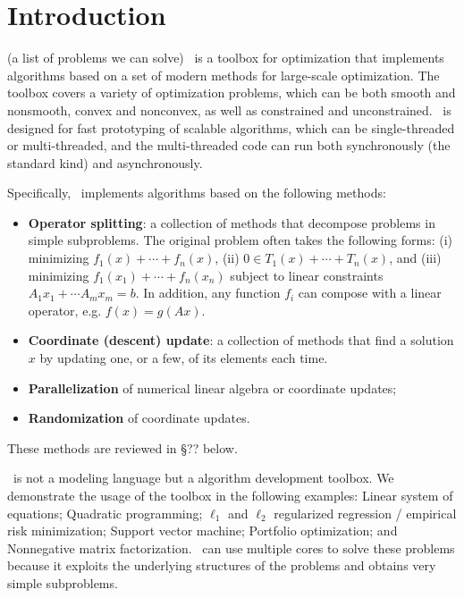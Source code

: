 \section{Introduction}
(a list of problems we can solve)
\pkg~is a toolbox for optimization that implements algorithms based on a set of modern methods for large-scale optimization. The toolbox covers a variety of optimization problems, which can  be both smooth and nonsmooth, convex and nonconvex, as well as constrained and unconstrained.  \pkg~is designed for fast prototyping of scalable algorithms, which can be  single-threaded or multi-threaded, and the multi-threaded code can run both synchronously (the standard kind) and asynchronously. 

Specifically, \pkg~implements  algorithms based on  the following methods:
\begin{itemize}
\item \textbf{Operator splitting}: a collection of methods that decompose problems in simple subproblems. The original problem often takes the following forms: (i) minimizing $f_1(x)+\cdots+f_n(x)$, (ii) $0\in T_1(x)+\cdots +T_n(x)$, and (iii) minimizing $f_1(x_1)+\cdots+f_n(x_n)$ subject to linear constraints $A_1 x_1+\cdots A_m x_m=b$. In addition, any function $f_i$ can compose with a linear operator, e.g. $f(x) = g(Ax)$.

\item \textbf{Coordinate (descent) update}: a collection of methods that find a solution $x$ by updating one, or a few, of its elements each time.
\item \textbf{Parallelization} of numerical linear algebra or coordinate updates;
\item  \textbf{Randomization} of coordinate updates.
\end{itemize}
These methods are reviewed in \S?? below.

\pkg~is not a modeling language but a algorithm development toolbox. %
We demonstrate the usage of the toolbox in the following examples:
 Linear system of equations;
Quadratic programming;
$\ell_1$ and $\ell_2$ regularized  regression / empirical risk minimization;
Support vector machine;
Portfolio optimization;
and Nonnegative matrix factorization.
\pkg~can use multiple cores to solve these  problems because it exploits the underlying structures of the problems and obtains very simple subproblems. %

